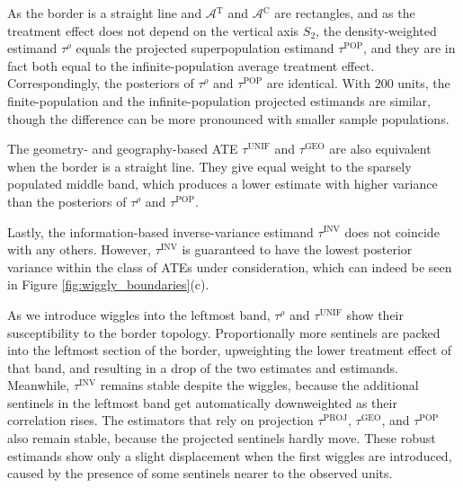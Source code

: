 \documentclass[letter]{article}
\newcommand{\area}{\mathcal{A}}
\newcommand{\treat}{\mathrm{T}}
\newcommand{\ctrol}{\mathrm{C}}
\newcommand{\treatarea}{\area{}^{\treat}}
\newcommand{\ctrolarea}{\area{}^{\ctrol}}
\newcommand{\unifavg}{\tau^{\mathrm{UNIF}}}
\newcommand{\invvar}{\tau^{\mathrm{INV}}}
\newcommand{\taurho}{\tau^{\rho}}
\newcommand{\tauproj}{\tau^{\mathrm{PROJ}}}
\newcommand{\taugeo}{\tau^{\mathrm{GEO}}}
\newcommand{\taupop}{\tau^{\mathrm{POP}}}
\begin{document}
As the border is a straight line and \(\treatarea\) and \(\ctrolarea\) are rectangles,
and as the treatment effect does not depend on the vertical axis \(S_2\),
the density-weighted estimand \(\taurho\) equals the projected superpopulation estimand \(\taupop\),
and they are in fact both equal to the infinite-population average treatment effect.
Correspondingly, the posteriors of \(\taurho\) and \(\taupop\) are identical.
With 200 units, the finite-population and the infinite-population projected estimands are similar, though the difference can be more pronounced with smaller sample populations.

The geometry- and geography-based ATE \(\unifavg\) and \(\taugeo\) are also equivalent when the border is a straight line.
They give equal weight to the sparsely populated middle band, which produces a lower estimate with higher variance than the posteriors of \(\taurho\) and \(\taupop\).

Lastly, the information-based inverse-variance estimand \(\invvar\) does not coincide with any others.
However, \(\invvar\) is guaranteed to have the lowest posterior variance within the class of ATEs under consideration, which can indeed be seen in Figure \ref{fig:wiggly_boundaries}(c).

As we introduce wiggles into the leftmost band,
\(\taurho\) and \(\unifavg\) show their susceptibility to the border topology.
Proportionally more sentinels are packed into the leftmost section of the border,
upweighting the lower treatment effect of that band,
and resulting in a drop of the two estimates and estimands.
Meanwhile, \(\invvar\) remains stable despite the wiggles,
because the additional sentinels in the leftmost
band get automatically downweighted as their correlation rises.
The estimators that rely on projection
\(\tauproj\), \(\taugeo\), and \(\taupop\) also remain stable,
because the projected sentinels hardly move.
These robust estimands show only a slight displacement when the first wiggles are introduced,
caused by the presence of some sentinels nearer to the observed units.
    
\end{document}
